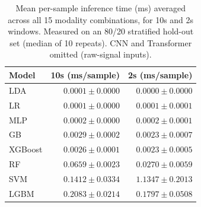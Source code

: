 \begin{table}[!htbp]
  \centering
  \caption{Mean per-sample inference time (ms) averaged across all 15 modality combinations, for 10s and 2s windows. Measured on an 80/20 stratified hold-out set (median of 10 repeats). CNN and Transformer omitted (raw-signal inputs).}
  \label{tab:inference_time}
  \begin{tabular}{lrr}
    \toprule
    \textbf{Model} & \textbf{10s (ms/sample)} & \textbf{2s (ms/sample)} \\
    \midrule
    LDA & $0.0001 \pm 0.0000$ & $0.0000 \pm 0.0000$ \\
    LR & $0.0001 \pm 0.0000$ & $0.0001 \pm 0.0001$ \\
    MLP & $0.0002 \pm 0.0000$ & $0.0002 \pm 0.0001$ \\
    GB & $0.0029 \pm 0.0002$ & $0.0023 \pm 0.0007$ \\
    XGBoost & $0.0026 \pm 0.0001$ & $0.0023 \pm 0.0005$ \\
    RF & $0.0659 \pm 0.0023$ & $0.0270 \pm 0.0059$ \\
    SVM & $0.1412 \pm 0.0334$ & $1.1347 \pm 0.2013$ \\
    LGBM & $0.2083 \pm 0.0214$ & $0.1797 \pm 0.0508$ \\
    \bottomrule
  \end{tabular}
\end{table}
